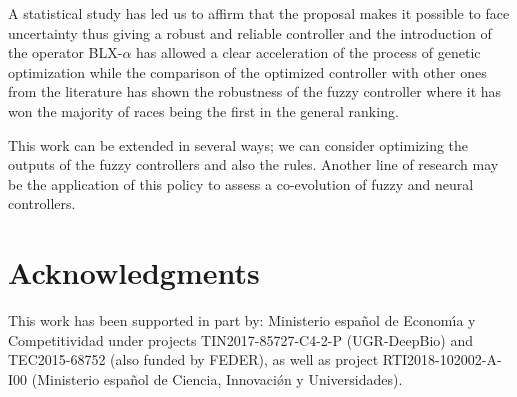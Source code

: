 \documentclass[10pt,journal,compsoc]{IEEEtran}
\begin{document}
A statistical study has led us to affirm that the proposal makes it
possible to face uncertainty thus giving a robust and reliable
controller and the introduction of the operator BLX-$\alpha$ has
allowed a clear acceleration of the process of genetic optimization
while the comparison of the optimized controller with other ones from
the literature has shown the robustness of the fuzzy controller where
it has won the majority of races being the first in the general
ranking.


This work can be extended in several ways; we can consider optimizing the outputs of the fuzzy controllers and also the rules.
Another line of research may be the application of this policy to assess a co-evolution of fuzzy and neural controllers.



\section*{Acknowledgments}

This work has been supported in part by: Ministerio espa\~{n}ol de
Econom\'{\i}a y Competitividad under projects  TIN2017-85727-C4-2-P (UGR-DeepBio) and TEC2015-68752 (also funded by FEDER), as well as project RTI2018-102002-A-I00 (Ministerio espa\~{n}ol de Ciencia, Innovaci\'{\o}n y Universidades).












\end{document}

